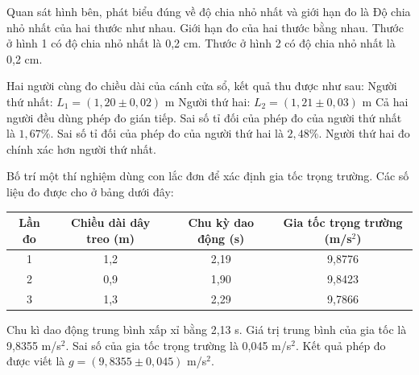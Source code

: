 \begin{ex}
Quan sát hình bên, phát biểu đúng về độ chia nhỏ nhất và giới hạn đo là
\choice
{Độ chia nhỏ nhất của hai thước như nhau.}
{\True Giới hạn đo của hai thước bằng nhau.}
{Thước ở hình 1 có độ chia nhỏ nhất là 0,2 cm.}
{Thước ở hình 2 có độ chia nhỏ nhất là 0,2 cm.}
\end{ex}

\begin{ex}
Hai người cùng đo chiều dài của cánh cửa sổ, kết quả thu được như sau:
Người thứ nhất: $L_1 = (1,20 \pm 0,02)$ m
Người thứ hai: $L_2 = (1,21 \pm 0,03)$ m
\choiceTF
{Cả hai người đều dùng phép đo gián tiếp.}
{\True Sai số tỉ đối của phép đo của người thứ nhất là $1,67\%$.}
{\True Sai số tỉ đối của phép đo của người thứ hai là $2,48\%$.}
{Người thứ hai đo chính xác hơn người thứ nhất.}
\end{ex}

\begin{ex}
Bố trí một thí nghiệm dùng con lắc đơn để xác định gia tốc trọng trường. Các số liệu đo được cho ở bảng dưới đây:
\begin{tabular}{|c|c|c|c|}
\hline
Lần đo & Chiều dài dây treo (m) & Chu kỳ dao động (s) & Gia tốc trọng trường (m/s$^2$) \\
\hline
1 & 1,2 & 2,19 & 9,8776 \\
2 & 0,9 & 1,90 & 9,8423 \\
3 & 1,3 & 2,29 & 9,7866 \\
\hline
\end{tabular}
\choiceTF
{Chu kì dao động trung bình xấp xỉ bằng 2,13 s.}
{\True Giá trị trung bình của gia tốc là 9,8355 m/s$^2$.}
{Sai số của gia tốc trọng trường là 0,045 m/s$^2$.}
{\True Kết quả phép đo được viết là $g = (9,8355 \pm 0,045)$ m/s$^2$.}
\end{ex}

